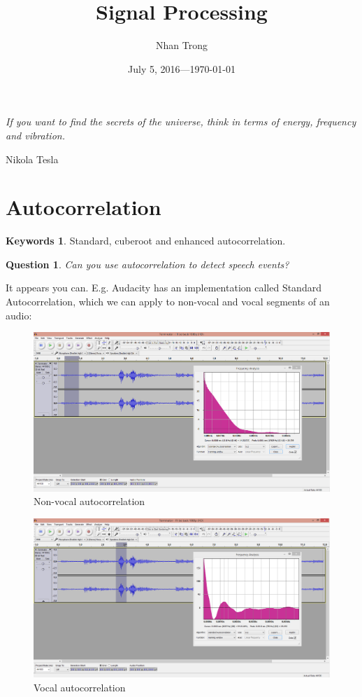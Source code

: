 \documentclass[12pt]{article}
\title{Signal Processing}
\author{Nhan Trong}
\date{July 5, 2016---\today}                                           %
\theoremstyle{plain}
\newtheorem{question}[theorem]{Question}
\theoremstyle{definition}
\newtheorem*{keywords}{Keywords}
\theoremstyle{remark}
\begin{document}
\maketitle

\epigraph{\textit{If you want to find the secrets of the universe, think in terms of energy, frequency and vibration.}}{Nikola Tesla}

\section{Autocorrelation}

\begin{keywords}
Standard, cuberoot and enhanced autocorrelation.
\end{keywords}

\begin{question}
Can you use autocorrelation to detect speech events?
\end{question}

It appears you can. E.g. Audacity has an implementation called Standard Autocorrelation, which we can apply to non-vocal and vocal segments of an audio:

\begin{figure}[H]
\centering
\includegraphics[width=1.0\textwidth]{autocorrelation1}
\caption{Non-vocal autocorrelation}
\end{figure}

\begin{figure}[H]
\centering
\includegraphics[width=1.0\textwidth]{autocorrelation2}
\caption{Vocal autocorrelation}
\end{figure}
\end{document}
